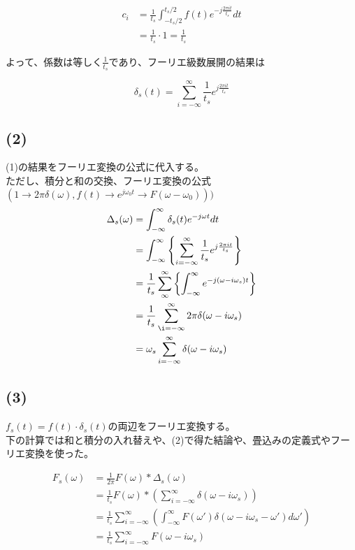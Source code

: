 \documentclass[a4paper,12pt,xelatex,ja=standard]{bxjsarticle}
\begin{document}
\begin{equation*}
  \begin{split}
    c_i
      &= \frac{1}{t_s}\int^{t_s/2}_{-t_s/2}f(t) e^{-j \frac{2 \pi i t}{t_s}}dt \\
      &= \frac{1}{t_s} \cdot 1 = \frac{1}{t_s}
  \end{split}
\end{equation*}

よって、係数は等しく$\frac{1}{t_s}$であり、フーリエ級数展開の結果は

\[
  \delta_s(t) = \sum^{\infty}_{i = -\infty}\frac{1}{t_s}e^{j \frac{2 \pi i t}{t_s}}
\]

\subsection*{(2)}
(1)の結果をフーリエ変換の公式に代入する。\\
ただし、積分と和の交換、フーリエ変換の公式$\left( 1 \to 2\pi \delta(\omega), f(t) \to e^{j \omega_0 t} \to F(\omega - \omega_0)\right))$
\begin{equation*}
  \begin{split}
    \Delta_s(\omega)
      &= \int^{\infty}_{-\infty}\delta_s(t)e^{- j \omega t}dt \\
      &= \int^{\infty}_{-\infty}\left\{\sum^{\infty}_{i = -\infty} \frac{1}{t_s}e^{j \frac{2 \pi i t}{t_s}}\right\} \\
      &= \frac{1}{t_s} \sum^{\infty}_{\infty}\left\{\int^{\infty}_{-\infty} e^{-j(\omega - i\omega_s)t}\right\} \\
      &= \frac{1}{t_s} \sum^{\infty}_{\i= -\infty}2\pi \delta(\omega - i \omega_s) \\
      &= \omega_s \sum^{\infty}_{i = -\infty}\delta(\omega - i \omega_s)
  \end{split}
\end{equation*}

\subsection*{(3)}
$f_s(t) = f(t) \cdot \delta_s(t)$の両辺をフーリエ変換する。\\
下の計算では和と積分の入れ替えや、(2)で得た結論や、畳込みの定義式やフーリエ変換を使った。

\begin{equation*}
  \begin{split}
    F_s(\omega)
      &= \frac{1}{2 \pi}F(\omega) * \Delta_s(\omega) \\
      &= \frac{1}{t_s}F(\omega) * \left(\sum^{\infty}_{i = -\infty}\delta(\omega - i \omega_s)\right) \\
      &= \frac{1}{t_s} \sum^{\infty}_{i = - \infty} \left(\int^{\infty}_{-\infty}F(\omega')\delta(\omega - i\omega_s - \omega') d\omega'\right) \\
      &= \frac{1}{t_s} \sum^{\infty}_{i = - \infty} F(\omega - i\omega_s) \\
  \end{split}
\end{equation*}
\end{document}
